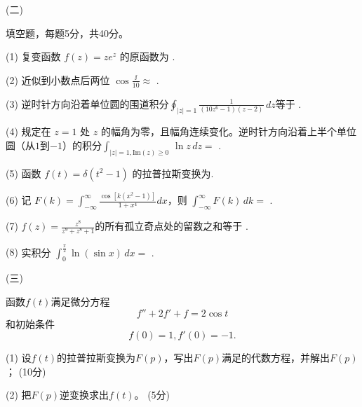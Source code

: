 \documentclass[12pt,CJK]{article}
\begin{document}
\item[(二)]{ 填空题，每题5分，共40分。


  \bitem
\item[(1)]{复变函数 $f(z)= ze^z$ 的原函数为 \tbfill.}      
\item[(2)]{近似到小数点后两位 $ \cos \frac{\ii}{10} \approx$ \tbfill .}
\item[(3)]{逆时针方向沿着单位圆的围道积分$\oint_{|z|=1}\frac{1}{(10z^{6}-1)(z-2)}\,dz$等于 \tbfill.}
\item[(4)]{规定在 $z=1$ 处 $z$ 的幅角为零，且幅角连续变化。逆时针方向沿着上半个单位圆（从$1$到$-1$）的积分$\int_{|z|=1, \mathrm{Im}(z)\ge 0}\, \ln z \,dz = $ \tbfill .}
\item[(5)]{ 函数 $f(t) = \delta(t^2-1)$ 的拉普拉斯变换为\tbfill.}
\item[(6)]{记 $ F(k) = \int_{-\infty}^\infty \frac{\cos{\left[k(x^2-1)\right]}}{1+x^4} dx $，则 $ \int_{-\infty}^\infty F(k)\, dk = $ \tbfill .}
\item[(7)]{$f(z) = \frac{z^8}{z^9+z^8+1}$的所有孤立奇点处的留数之和等于 \tbfill.}
\item[(8)]{实积分 $\int_0^{\frac{\pi}{2}} \ln (\sin x) \, dx  = $ \tbfill .}
  \eitem
}

\item[(三)]{函数$f(t)$满足微分方程
  $$f'' + 2f' + f =  2\cos t $$
  和初始条件
  $$f(0) = 1, f'(0) = -1. $$
  \bitem
\item[(1)]{设$f(t)$的拉普拉斯变换为$F(p)$，写出$F(p)$满足的代数方程，并解出$F(p)$； (10分)}
\item[(2)]{把$F(p)$逆变换求出$f(t)$。 (5分)}  
  \eitem
}  
  
\eitem


\ech
\end{document}

